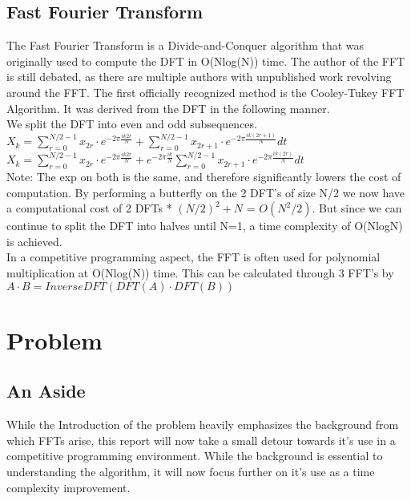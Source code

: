 \documentclass{article}
\begin{document}
\subsection{Fast Fourier Transform}
The Fast Fourier Transform is a Divide-and-Conquer algorithm that was originally used to compute the DFT in O(Nlog(N)) time. The author of the FFT is still debated, as there are multiple authors with unpublished work revolving around the FFT. The first officially recognized method is the Cooley-Tukey FFT Algorithm. It was derived from the DFT in the following manner. \\
We split the DFT into even and odd subsequences. \\
$X_{k} = \sum_{r=0}^{N/2-1} x_{2r} \cdot e^{-2\pi \frac{ik2r}{N}} + \sum_{r=0}^{N/2-1} x_{2r+1} \cdot e^{-2\pi \frac{ik(2r+1)}{N}} dt$ \\
$X_{k} = \sum_{r=0}^{N/2-1} x_{2r} \cdot e^{-2\pi \frac{ik2r}{N}} + e^{-2\pi \frac{ik}{N}}\sum_{r=0}^{N/2-1} x_{2r+1} \cdot e^{-2\pi \frac{ik(2r)}{N}} dt$ \\
Note: The exp on both is the same, and therefore significantly lowers the cost of computation.
By performing a butterfly on the 2 DFT's of size N/2 we now have a computational cost of 2 DFTs * $(N/2)^2 + N$ = $O(N^{2} / 2)$. But since we can continue to split the DFT into halves until N=1, a time complexity of O(NlogN) is achieved. \\
In a competitive programming aspect, the FFT is often used for polynomial multiplication at O(Nlog(N)) time. This can be calculated through 3 FFT's by \\ $A\cdot B = InverseDFT(DFT(A)\cdot DFT(B))$

\section{Problem}
\subsection{An Aside}
While the Introduction of the problem heavily emphasizes the background from which FFTs arise, this report will now take a small detour towards it's use in a competitive programming environment. While the background is essential to understanding the algorithm, it will now focus further on it's use as a time complexity improvement.
\end{document}
